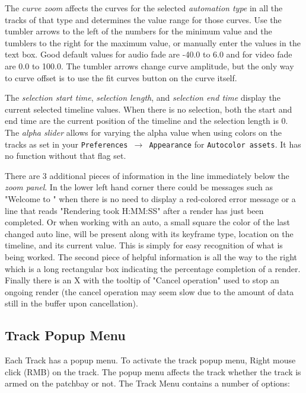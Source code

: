 The \emph{curve zoom}  affects the curves for the selected \emph{automation type} in all the tracks of that type and determines the value range for those curves. 
Use the tumbler arrows to the left of the numbers for the minimum value and the tumblers to the right for the maximum value, or manually enter the values in the text box. 
Good default values for audio fade are -40.0 to 6.0 and for video fade are 0.0 to 100.0. 
The tumbler arrows change curve amplitude, but the only way to curve offset is to use the fit curves button on the curve itself.

The \emph{selection start time}, \emph{selection length}, and \emph{selection end time}  display the current selected timeline values. When there is no selection, both the start and end time are the current
position of the timeline and the selection length is 0.
The \emph{alpha slider}  allows for varying the alpha value when using colors on the tracks as set in your \texttt{Preferences $\rightarrow$ Appearance} for \texttt{Autocolor assets}.  
It has no function without that flag set.

There are 3 additional pieces of information in the line immediately below the \textit{zoom panel}.
In the lower left hand corner there could be messages such as "Welcome to \CGG{}" when there is no 
need to display a red-colored error message or a line that reads "Rendering took H:MM:SS" after a render
has just been completed. Or when working with an auto, a small square the color of the last changed auto line, will be
present along with its keyframe type, location on the timeline, and its current value.  This is simply
for easy recognition of what is being worked. The second piece of helpful information is all the way to
the right which is a long rectangular box indicating the percentage completion of a render. Finally
there is an X with the tooltip of "Cancel operation"  used to stop an ongoing render
(the cancel operation may seem slow due to the amount of data still in the buffer upon cancellation).

\subsection{Track Popup Menu}%
\label{sub:track_popup_menu}

Each Track has a popup menu. 
To activate the track popup menu, Right mouse click (RMB) on the track. 
The popup menu affects the track whether the track is armed on the patchbay or not. 
The Track Menu contains a number of options:

